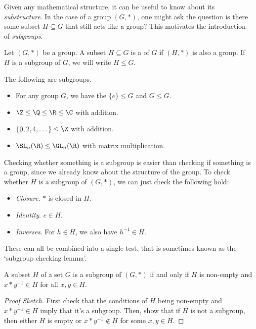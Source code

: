 \documentclass[a4paper]{scrartcl}
\begin{document}
Given any mathematical structure, it can be useful to know about its \emph{substructure}. In the case of a group $(G, *)$, one might ask the question is there some subset $H \subseteq G$ that still acts like a group? This motivates the introduction of \emph{subgroups}.

\begin{definition}[Subgroups]
	Let $(G, *)$ be a group. A subset $H \subseteq G$ is a  of $G$ if $(H, *)$ is also a group. If $H$ is a subgroup of $G$, we will write $H \leq G$.
\end{definition}

\begin{example}
	The following are subgroups.
	\begin{itemize}
		\item For any group $G$, we have the  $\{ e \} \leq G$ and $G \leq G$.
		\item $\Z \leq \Q \leq \R \leq \C$ with addition.
		\item $\{ 0, 2, 4, \dots \} \leq \Z$ with addition.
		\item $\SL_n(\R) \leq \GL_n(\R)$ with matrix multiplication.
	\end{itemize}
\end{example}


Checking whether something is a subgroup is easier than checking if something is a group, since we already know about the structure of the group. To check whether $H$ is a subgroup of $(G, *)$, we can just check the following hold:
\begin{itemize}
	\item \emph{Closure}. $*$ is closed in $H$.
	\item \emph{Identity}. $e \in H$.
	\item \emph{Inverses}. For $h \in H$, we also have $h^{-1} \in H$. 
\end{itemize}

These can all be combined into a single test, that is sometimes known as the `subgroup checking lemma'.

\begin{lemma}
	A subset $H$ of a set $G$ is a subgroup of $(G, *)$ if and only if $H$ is non-empty and $x * y^{-1} \in H$ for all $x, y \in H$.
\end{lemma}
\begin{proof}[Proof Sketch]
	First check that the conditions of $H$ being non-empty and $x * y^{-1} \in H$ imply that it's a subgroup. Then, show that if $H$ is not a subgroup, then either $H$ is empty or $x * y^{-1} \not\in H$ for some $x, y \in H$.
\end{proof}
\end{document}
